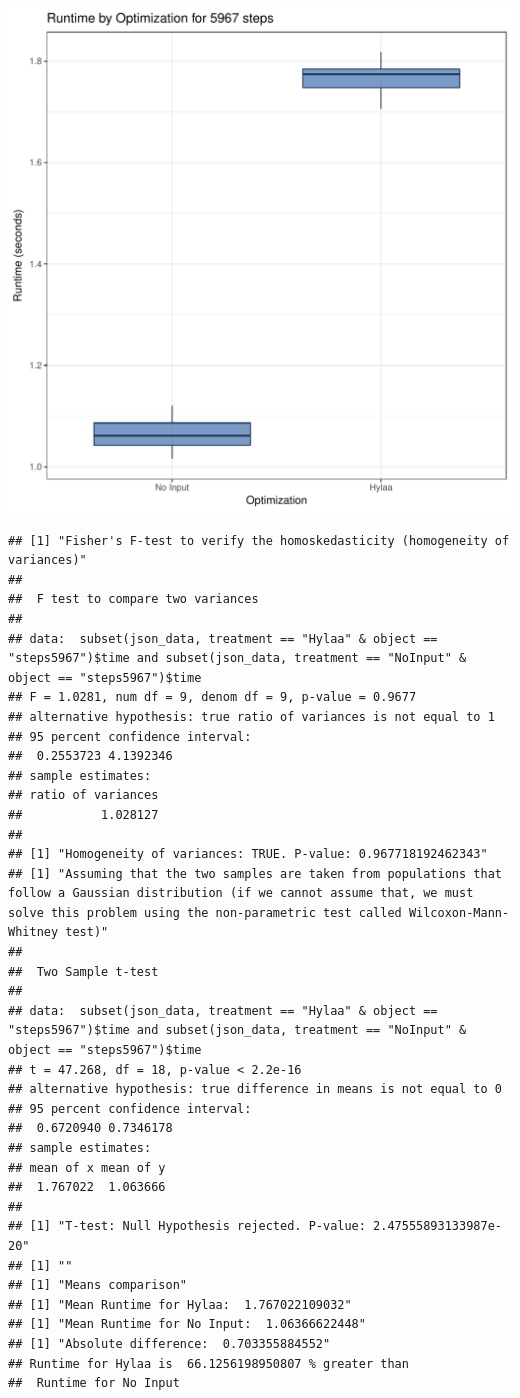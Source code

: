 \documentclass{article}\usepackage[]{graphicx}\usepackage[]{color}
\makeatletter
\def\maxwidth{ %
  \ifdim\Gin@nat@width>\linewidth
    \linewidth
  \else
    \Gin@nat@width
  \fi
}
\newenvironment{kframe}{%
 \def\at@end@of@kframe{}%
 \ifinner\ifhmode%
  \def\at@end@of@kframe{\end{minipage}}%
  \begin{minipage}{\columnwidth}%
 \fi\fi%
 \def\FrameCommand##1{\hskip\@totalleftmargin \hskip-\fboxsep
 \colorbox{shadecolor}{##1}\hskip-\fboxsep
     \hskip-\linewidth \hskip-\@totalleftmargin \hskip\columnwidth}%
 \MakeFramed {\advance\hsize-\width
   \@totalleftmargin\z@ \linewidth\hsize
   \@setminipage}}%
 {\par\unskip\endMakeFramed%
 \at@end@of@kframe}
\newenvironment{knitrout}{}{} %
\makeatother
\begin{document}
\begin{knitrout}
\color{fgcolor}
\includegraphics[width=\maxwidth]{figure/RH4_steps5967-1} 
\begin{kframe}\begin{verbatim}
## [1] "Fisher's F-test to verify the homoskedasticity (homogeneity of variances)"
## 
## 	F test to compare two variances
## 
## data:  subset(json_data, treatment == "Hylaa" & object == "steps5967")$time and subset(json_data, treatment == "NoInput" & object == "steps5967")$time
## F = 1.0281, num df = 9, denom df = 9, p-value = 0.9677
## alternative hypothesis: true ratio of variances is not equal to 1
## 95 percent confidence interval:
##  0.2553723 4.1392346
## sample estimates:
## ratio of variances 
##           1.028127 
## 
## [1] "Homogeneity of variances: TRUE. P-value: 0.967718192462343"
## [1] "Assuming that the two samples are taken from populations that follow a Gaussian distribution (if we cannot assume that, we must solve this problem using the non-parametric test called Wilcoxon-Mann-Whitney test)"
## 
## 	Two Sample t-test
## 
## data:  subset(json_data, treatment == "Hylaa" & object == "steps5967")$time and subset(json_data, treatment == "NoInput" & object == "steps5967")$time
## t = 47.268, df = 18, p-value < 2.2e-16
## alternative hypothesis: true difference in means is not equal to 0
## 95 percent confidence interval:
##  0.6720940 0.7346178
## sample estimates:
## mean of x mean of y 
##  1.767022  1.063666 
## 
## [1] "T-test: Null Hypothesis rejected. P-value: 2.47555893133987e-20"
## [1] ""
## [1] "Means comparison"
## [1] "Mean Runtime for Hylaa:  1.767022109032"
## [1] "Mean Runtime for No Input:  1.06366622448"
## [1] "Absolute difference:  0.703355884552"
## Runtime for Hylaa is  66.1256198950807 % greater than 
##  Runtime for No Input
\end{verbatim}
\end{kframe}
\end{knitrout}
\end{document}
